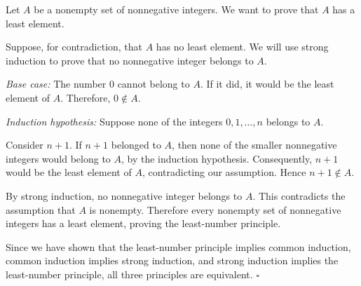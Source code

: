 \documentclass[11pt]{article}
\newcommand{\qed}{\hfill$\square$}
\begin{document}
Let $A$ be a nonempty set of nonnegative integers.
We want to prove that $A$ has a least element.

Suppose, for contradiction, that $A$ has no least
element. We will use strong induction to prove that
no nonnegative integer belongs to $A$.

\textit{Base case:} The number $0$ cannot belong to $A$.
If it did, it would be the least element of $A$.
Therefore, $0\notin A$.

\textit{Induction hypothesis:} Suppose none of the
integers $0,1,\ldots,n$ belongs to $A$.

Consider $n+1$. If $n+1$ belonged to $A$, then none
of the smaller nonnegative integers would belong to
$A$, by the induction hypothesis. Consequently,
$n+1$ would be the least element of $A$, contradicting
our assumption. Hence $n+1\notin A$.

By strong induction, no nonnegative integer belongs
to $A$. This contradicts the assumption that $A$ is
nonempty. Therefore every nonempty set of nonnegative
integers has a least element, proving the least-number
principle.

Since we have shown that the least-number principle
implies common induction, common induction implies
strong induction, and strong induction implies the
least-number principle, all three principles are
equivalent. \qed
\end{document}
